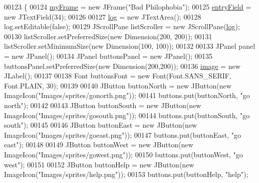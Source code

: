 \begin{DoxyCode}
00123                              \{
00124         \hyperlink{classpkg__game_1_1UserInterface_a482eeb80a47dd8c4148af0ea648a8b49}{myFrame} = \textcolor{keyword}{new} JFrame(\textcolor{stringliteral}{"Bad Philophobia"});
00125         \hyperlink{classpkg__game_1_1UserInterface_ae405fc2ad81ccf31aad56484a9c1c2bc}{entryField} = \textcolor{keyword}{new} JTextField(34);
00126 
00127         \hyperlink{classpkg__game_1_1UserInterface_adc5e92cdd16b74971a7f6ff74d96bffb}{log} = \textcolor{keyword}{new} JTextArea();
00128         log.setEditable(\textcolor{keyword}{false});
00129         JScrollPane listScroller = \textcolor{keyword}{new} JScrollPane(\hyperlink{classpkg__game_1_1UserInterface_adc5e92cdd16b74971a7f6ff74d96bffb}{log});
00130         listScroller.setPreferredSize(\textcolor{keyword}{new} Dimension(200, 200));
00131         listScroller.setMinimumSize(\textcolor{keyword}{new} Dimension(100, 100));
00132 
00133         JPanel panel = \textcolor{keyword}{new} JPanel();
00134         JPanel buttonsPanel = \textcolor{keyword}{new} JPanel();
00135         buttonsPanel.setPreferredSize(\textcolor{keyword}{new} Dimension(200,200));
00136         \hyperlink{classpkg__game_1_1UserInterface_ac4146c151419321baacf6fb1769e7510}{image} = \textcolor{keyword}{new} JLabel();
00137 
00138         Font buttonsFont = \textcolor{keyword}{new} Font(Font.SANS\_SERIF, Font.PLAIN, 30);
00139 
00140         JButton buttonNorth = \textcolor{keyword}{new} JButton(\textcolor{keyword}{new} ImageIcon(\textcolor{stringliteral}{"Images/sprites/gonorth.png"}));
00141         buttons.put(buttonNorth, \textcolor{stringliteral}{"go north"});
00142 
00143         JButton buttonSouth = \textcolor{keyword}{new} JButton(\textcolor{keyword}{new} ImageIcon(\textcolor{stringliteral}{"Images/sprites/gosouth.png"}));
00144         buttons.put(buttonSouth, \textcolor{stringliteral}{"go south"});
00145 
00146         JButton buttonEast = \textcolor{keyword}{new} JButton(\textcolor{keyword}{new} ImageIcon(\textcolor{stringliteral}{"Images/sprites/goeast.png"}));
00147         buttons.put(buttonEast, \textcolor{stringliteral}{"go east"});
00148 
00149         JButton buttonWest = \textcolor{keyword}{new} JButton(\textcolor{keyword}{new} ImageIcon(\textcolor{stringliteral}{"Images/sprites/gowest.png"}));
00150         buttons.put(buttonWest, \textcolor{stringliteral}{"go west"});
00151 
00152         JButton buttonHelp = \textcolor{keyword}{new} JButton(\textcolor{keyword}{new} ImageIcon(\textcolor{stringliteral}{"Images/sprites/help.png"}));
00153         buttons.put(buttonHelp, \textcolor{stringliteral}{"help"});

\end{DoxyCode}
